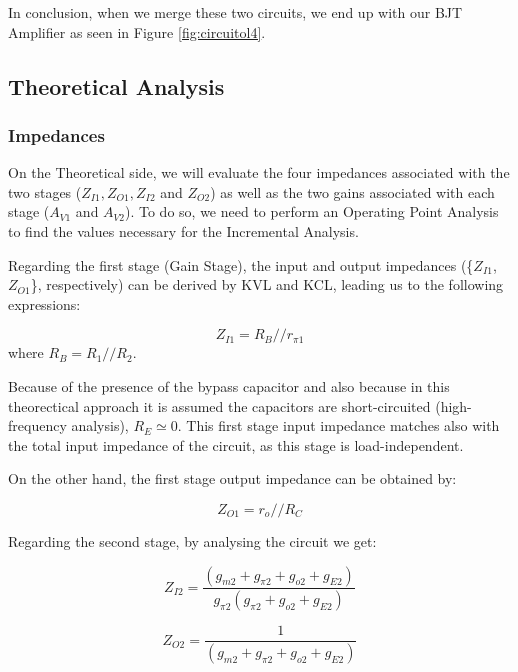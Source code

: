 In conclusion, when we merge these two circuits, we end up with our BJT Amplifier as seen in Figure \ref{fig:circuitol4}.

\clearpage
\subsection{Theoretical Analysis}
\label{subsec:Req}

\subsubsection{Impedances}

On the Theoretical side, we will evaluate the four impedances associated with the two stages ($Z_{I1}, Z_{O1}, Z_{I2}$ and $Z_{O2}$) as well as the two gains associated with each stage ($A_{V1}$ and $A_{V2}$).
To do so, we need to perform an Operating Point Analysis to find the values necessary for the Incremental Analysis.

Regarding the first stage (Gain Stage), the input and output impedances (\{$Z_{I1}$, $Z_{O1}$\}, respectively) can be derived by KVL and KCL, leading us to the following expressions:

\begin{equation}
    Z_{I1}=R_B // r_{\pi 1}
\end{equation}
where $R_B=R_1 // R_2$.

Because of the presence of the bypass capacitor and also because in this theorectical approach it is assumed the capacitors are short-circuited (high-frequency analysis), $R_E \simeq 0$. This first stage input impedance matches also with the total input impedance of the circuit, as this stage is load-independent.

On the other hand, the first stage output impedance can be obtained by:

\begin{equation}
    Z_{O1}=r_o // R_C  
\end{equation}

Regarding the second stage, by analysing the circuit we get:

\begin{equation}
    Z_{I2}=\frac{(g_{m2}+g_{\pi2}+g_{o2}+g_{E2})}{g_{\pi2}(g_{\pi2}+g_{o2}+g_{E2})}
\end{equation}

\begin{equation}
    Z_{O2}=\frac{1}{(g_{m2}+g_{\pi2}+g_{o2}+g_{E2})}
\end{equation}

